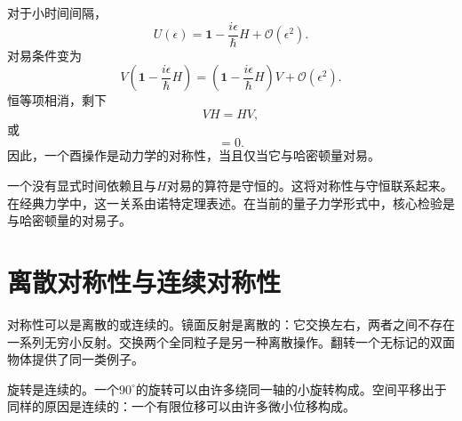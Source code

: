 \begin{classroomqa}
\end{classroomqa}

\begin{classroomqa}
\end{classroomqa}

对于小时间间隔，
\begin{equation}
U(\epsilon)
=
\mathbf 1-\frac{i\epsilon}{\hbar}H
+\mathcal O(\epsilon^2).
\end{equation}
对易条件变为
\begin{equation}
V\left(
\mathbf 1-\frac{i\epsilon}{\hbar}H
\right)
=
\left(
\mathbf 1-\frac{i\epsilon}{\hbar}H
\right)V
+\mathcal O(\epsilon^2).
\end{equation}
恒等项相消，剩下
\begin{equation}
VH=HV,
\end{equation}
或
\begin{equation}
[V,H]=0.
\end{equation}
因此，一个酉操作是动力学的对称性，当且仅当它与哈密顿量对易。

\begin{classroomqa}
\end{classroomqa}

一个没有显式时间依赖且与\(H\)对易的算符是守恒的。这将对称性与守恒联系起来。在经典力学中，这一关系由诺特定理表述。在当前的量子力学形式中，核心检验是与哈密顿量的对易子。

\section{离散对称性与连续对称性}

对称性可以是离散的或连续的。镜面反射是离散的：它交换左右，两者之间不存在一系列无穷小反射。交换两个全同粒子是另一种离散操作。翻转一个无标记的双面物体提供了同一类例子。

旋转是连续的。一个\(90^\circ\)的旋转可以由许多绕同一轴的小旋转构成。空间平移出于同样的原因是连续的：一个有限位移可以由许多微小位移构成。

